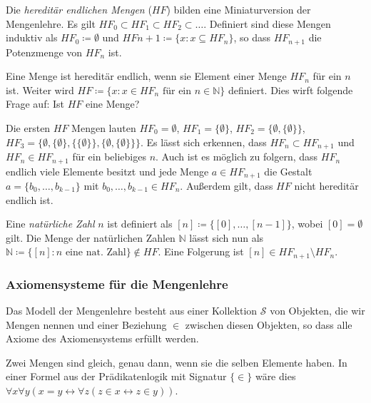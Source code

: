 \begin{definition}
	Die \textit{hereditär endlichen Mengen} ($HF$) bilden eine Miniaturversion der Mengenlehre. Es gilt $HF_0\subset HF_1 \subset HF_2 \subset \dots$. Definiert sind diese Mengen induktiv als $HF_0\coloneqq \emptyset$ und $HF{n+1}\coloneqq \{x : x\subseteq HF_n\}$, so dass $HF_{n+1}$ die Potenzmenge von $HF_n$ ist.
	
	Eine Menge ist hereditär endlich, wenn sie Element einer Menge $HF_n$ für ein $n$ ist. Weiter wird $HF\coloneqq\{x : x \in HF_n \text{ für ein }n\in \mathbb{N}\}$ definiert.
	Dies wirft folgende Frage auf: Ist $HF$ eine Menge? 
\end{definition}

Die ersten $HF$ Mengen lauten $HF_0=\emptyset$, $HF_1=\{\emptyset\}$, $HF_2=\{\emptyset,\{\emptyset\}\}$, \\ $HF_3=\{\emptyset, \{\emptyset\}, \{\{\emptyset\}\}, \{\emptyset,\{\emptyset\}\}\}$. Es lässt sich erkennen, dass $HF_n\subset HF_{n+1}$ und $HF_n\in HF_{n+1}$ für ein beliebiges $n$. Auch ist es möglich zu folgern, dass $HF_n$ endlich viele Elemente besitzt und jede Menge $a\in HF_{n+1}$ die Gestalt $a=\{b_0,\dots,b_{k-1}\}$ mit $b_0,\dots,b_{k-1}\in HF_n$. Außerdem gilt, dass $HF$ nicht hereditär endlich ist.

\begin{definition}
	Eine \textit{natürliche Zahl} $n$ ist definiert als $[n]\coloneqq\{[0],\dots,[n-1]\}$, wobei $[0]=\emptyset$ gilt. Die Menge der natürlichen Zahlen $\mathbb{N}$ lässt sich nun als $\mathbb{N}\coloneqq\{[n] : n \text{ eine nat. Zahl}\} \notin HF$. Eine Folgerung ist $[n]\in HF_{n+1}\setminus HF_n$.
\end{definition}

\subsubsection{Axiomensysteme für die Mengenlehre}

Das Modell der Mengenlehre besteht aus einer Kollektion $\mathcal{S}$ von Objekten, die wir Mengen nennen und einer Beziehung $\in$ zwischen diesen Objekten, so dass alle Axiome des Axiomensystems erfüllt werden.

\begin{definition}
	Zwei Mengen sind gleich, genau dann, wenn sie die selben Elemente haben. In einer Formel aus der Prädikatenlogik mit Signatur $\{\in\}$ wäre dies $\forall x \forall y (x=y \leftrightarrow \forall z (z \in x \leftrightarrow z \in y))$.
	\label{ExtAxiom}
\end{definition}

